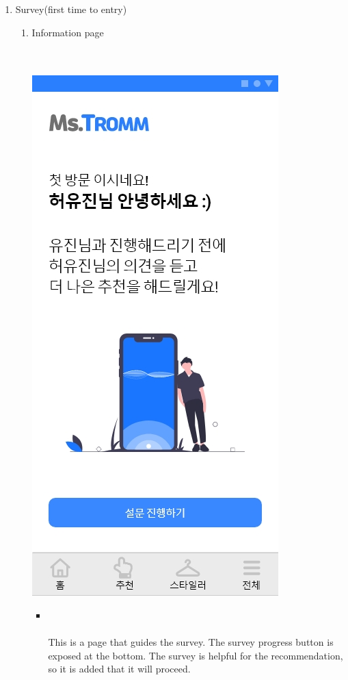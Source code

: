 \documentclass[conference]{IEEEtran}
\begin{document}
\begin{enumerate}
    \item Survey(first time to entry) 
    \begin{enumerate}
    \item Information page \\ \\ \\
    \centerline{\includegraphics[scale=0.32]{5. 설문.jpg}}
    \begin{itemize}
        \item[] \\ \\ This is a page that guides the survey. The survey progress button is exposed at the bottom. The survey is helpful for the recommendation, so it is added that it will proceed.\\ \\ \\ \\ \\

\end{itemize}
\end{enumerate}
\end{enumerate}
\end{document}
